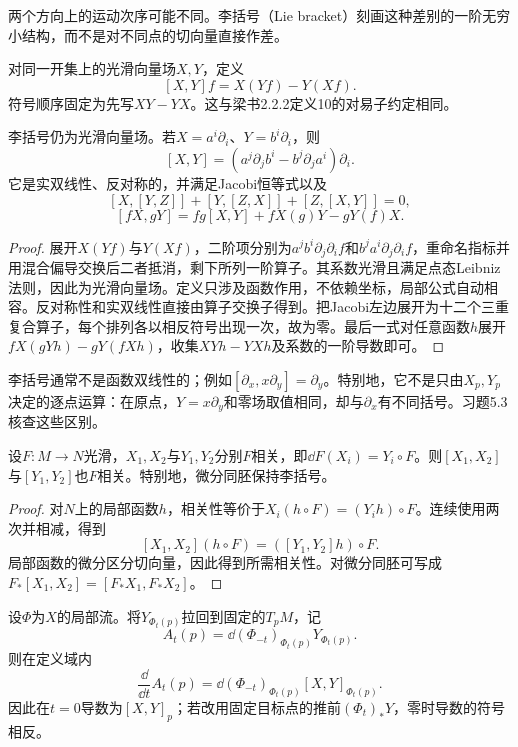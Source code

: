 两个方向上的运动次序可能不同。李括号（Lie bracket）刻画这种差别的一阶无穷小结构，而不是对不同点的切向量直接作差。
\begin{definition}[向量场的李括号]
对同一开集上的光滑向量场$X,Y$，定义
\[
 [X,Y]f=X(Yf)-Y(Xf).
\]
符号顺序固定为先写$XY-YX$。这与梁书2.2.2定义10的对易子约定相同。
\end{definition}
\begin{proposition}[坐标式与代数性质]\label{prop:lie-bracket}
李括号仍为光滑向量场。若$X=a^i\partial_i$、$Y=b^i\partial_i$，则
\[
 [X,Y]=(a^j\partial_jb^i-b^j\partial_ja^i)\partial_i.
\]
它是实双线性、反对称的，并满足Jacobi恒等式以及
\[
 [X,[Y,Z]]+[Y,[Z,X]]+[Z,[X,Y]]=0,
\]
\[
 [fX,gY]=fg[X,Y]+fX(g)Y-gY(f)X.
\]
\end{proposition}
\begin{proof}
展开$X(Yf)$与$Y(Xf)$，二阶项分别为$a^jb^i\partial_j\partial_i f$和$b^ja^i\partial_j\partial_i f$，重命名指标并用混合偏导交换后二者抵消，剩下所列一阶算子。其系数光滑且满足点态Leibniz法则，因此为光滑向量场。定义只涉及函数作用，不依赖坐标，局部公式自动相容。反对称性和实双线性直接由算子交换子得到。把Jacobi左边展开为十二个三重复合算子，每个排列各以相反符号出现一次，故为零。最后一式对任意函数$h$展开$fX(gYh)-gY(fXh)$，收集$XYh-YXh$及系数的一阶导数即可。
\end{proof}
李括号通常不是函数双线性的；例如$[\partial_x,x\partial_y]=\partial_y$。特别地，它不是只由$X_p,Y_p$决定的逐点运算：在原点，$Y=x\partial_y$和零场取值相同，却与$\partial_x$有不同括号。习题5.3核查这些区别。
\begin{proposition}[相关向量场的括号]\label{prop:related-bracket}
设$F:M\to N$光滑，$X_1,X_2$与$Y_1,Y_2$分别$F$相关，即$\dd F(X_i)=Y_i\circ F$。则$[X_1,X_2]$与$[Y_1,Y_2]$也$F$相关。特别地，微分同胚保持李括号。
\end{proposition}
\begin{proof}
对$N$上的局部函数$h$，相关性等价于$X_i(h\circ F)=(Y_i h)\circ F$。连续使用两次并相减，得到
\[
 [X_1,X_2](h\circ F)=([Y_1,Y_2]h)\circ F.
\]
局部函数的微分区分切向量，因此得到所需相关性。对微分同胚可写成$F_*[X_1,X_2]=[F_*X_1,F_*X_2]$。
\end{proof}
\begin{lemma}[沿流比较向量场的符号]\label{lem:bracket-flow}
设$\Phi$为$X$的局部流。将$Y_{\Phi_t(p)}$拉回到固定的$T_pM$，记
\[
 A_t(p)=\dd(\Phi_{-t})_{\Phi_t(p)}Y_{\Phi_t(p)}.
\]
则在定义域内
\[
 \frac{\dd}{\dd t}A_t(p)
 =\dd(\Phi_{-t})_{\Phi_t(p)}[X,Y]_{\Phi_t(p)}.
\]
因此在$t=0$导数为$[X,Y]_p$；若改用固定目标点的推前$(\Phi_t)_*Y$，零时导数的符号相反。
\end{lemma}
